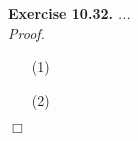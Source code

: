 \documentclass{article}
\begin{document}



\textbf{Exercise 10.32.}
\emph{...} \\

\emph{Proof.}
\begin{enumerate}
\item[(1)]
\item[(2)]

\end{enumerate}
$\Box$ \\\\



\end{document}
